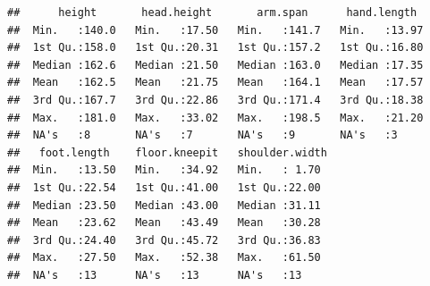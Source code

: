 \documentclass[]{article}
\begin{document}
\begin{verbatim}
##      height       head.height       arm.span      hand.length   
##  Min.   :140.0   Min.   :17.50   Min.   :141.7   Min.   :13.97  
##  1st Qu.:158.0   1st Qu.:20.31   1st Qu.:157.2   1st Qu.:16.80  
##  Median :162.6   Median :21.50   Median :163.0   Median :17.35  
##  Mean   :162.5   Mean   :21.75   Mean   :164.1   Mean   :17.57  
##  3rd Qu.:167.7   3rd Qu.:22.86   3rd Qu.:171.4   3rd Qu.:18.38  
##  Max.   :181.0   Max.   :33.02   Max.   :198.5   Max.   :21.20  
##  NA's   :8       NA's   :7       NA's   :9       NA's   :3      
##   foot.length    floor.kneepit   shoulder.width 
##  Min.   :13.50   Min.   :34.92   Min.   : 1.70  
##  1st Qu.:22.54   1st Qu.:41.00   1st Qu.:22.00  
##  Median :23.50   Median :43.00   Median :31.11  
##  Mean   :23.62   Mean   :43.49   Mean   :30.28  
##  3rd Qu.:24.40   3rd Qu.:45.72   3rd Qu.:36.83  
##  Max.   :27.50   Max.   :52.38   Max.   :61.50  
##  NA's   :13      NA's   :13      NA's   :13
\end{verbatim}






\newpage
\theendnotes

\newpage
\begin{auxmulticols}{2}
\singlespacing 


\end{auxmulticols}

\newpage
{
\hypersetup{linkcolor=black}
\setcounter{tocdepth}{3}
\tableofcontents
}
\end{document}
